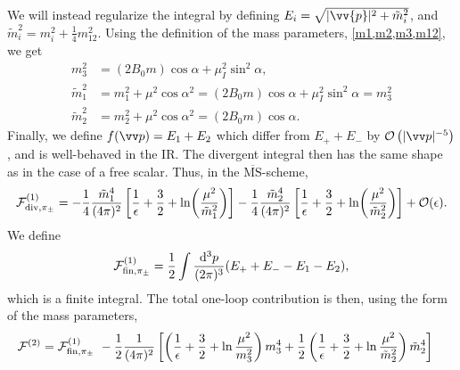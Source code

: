 We will instead regularize the integral by defining $E_i = \sqrt{|\vv{p}|^2 + \tilde m_i^2}$, and $\tilde m_i^2 = m_i^2 + \frac{1}{4} m_{12}^2$.
Using the definition of the mass parameters, \cref{m1,m2,m3,m12}, we get
\begin{align}
    m_3^2 & = (2 B_0 m) \cos \alpha + \mu_ I^2 \sin^2 \alpha, \\
    \tilde m_1^2 
    & 
    = m_1^2 + \mu^2 \cos\alpha^2
    = (2 B_0 m) \cos \alpha + \mu_I^2 \sin^2 \alpha
    = m_3^2 \\
    \tilde m_2^2 
    & = m_2^2 + \mu^2 \cos\alpha^2
    = (2 B_0 m) \cos \alpha.
\end{align}
Finally, we define $f(\vv p) = E_1 + E_2$ which differ from $E_+ + E_-$ by $\Oh[-5]{|\vv p|}$, and is well-behaved in the IR.
The divergent integral then has the same shape as in the case of a free scalar.
Thus, in the $\mathrm{\overline{MS}}$-scheme, 
\begin{equation}
    \mathcal{F}^{(1)}_{\mathrm{div}, \pi_\pm }
    =
    - \frac{1}{4} \frac{\tilde m_1^4}{(4\pi)^2} 
    \left[
        \frac{1}{\epsilon} + \frac{3}{2} + \ln(\frac{\mu^2}{\tilde m_1^2}) 
    \right] 
    - \frac{1}{4} \frac{\tilde m_2^4}{(4\pi)^2} 
    \left[
        \frac{1}{\epsilon} + \frac{3}{2} + \ln(\frac{\mu^2}{\tilde m_2^2})
    \right] 
    + \mathcal{O}(\epsilon).
\end{equation}
We define
\begin{equation}
    \mathcal{F}^{(1)}_{\mathrm{fin}, \pi_\pm}
    = 
    \frac{1}{2} \int \frac{\dd^3 p}{(2\pi)^3} (E_+ + E_- - E_1 - E_2),
\end{equation}
which is a finite integral.
The total one-loop contribution is then, using the form of the mass parameters,
\begin{align}
    \Ef^{(2)}
    & = 
    \Ef^{(1)}_{\mathrm{fin}, \pi_\pm} 
    - \frac{1}{2}\frac{1}{(4\pi)^2}
    \left[
        \left( \frac{1}{\epsilon} + \frac{3}{2} + \ln \frac{\mu^2}{m_3^2 } \right)
        m_3^4
        +
        \frac{1}{2}
        \left( \frac{1}{\epsilon} + \frac{3}{2} + \ln \frac{\mu^2}{\tilde m_2^2} \right)
        \tilde m_2^4
    \right]
\end{align}
